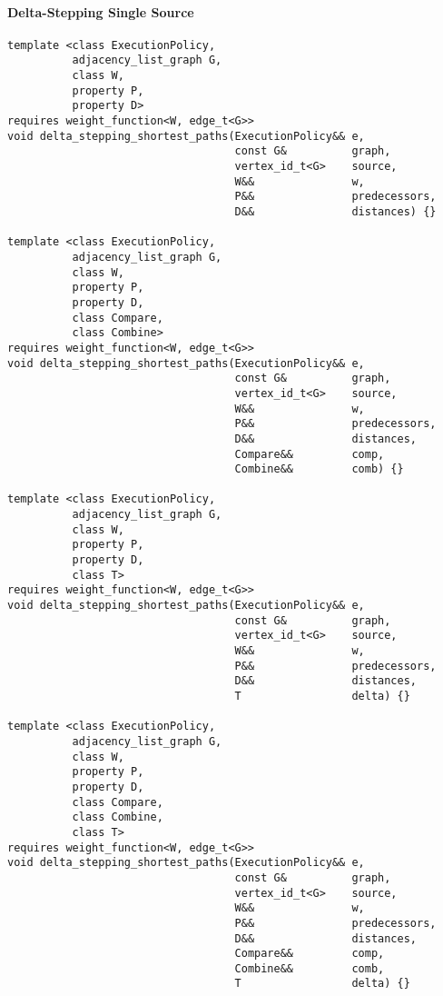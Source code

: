 \paragraph{Delta-Stepping Single Source}
\begin{lstlisting}
template <class ExecutionPolicy,
          adjacency_list_graph G,
          class W,
          property P,
          property D>
requires weight_function<W, edge_t<G>>
void delta_stepping_shortest_paths(ExecutionPolicy&& e,
                                   const G&          graph,
                                   vertex_id_t<G>    source,
                                   W&&               w,
                                   P&&               predecessors,
                                   D&&               distances) {}

template <class ExecutionPolicy,
          adjacency_list_graph G,
          class W,
          property P,
          property D,
          class Compare,
          class Combine>
requires weight_function<W, edge_t<G>>
void delta_stepping_shortest_paths(ExecutionPolicy&& e,
                                   const G&          graph,
                                   vertex_id_t<G>    source,
                                   W&&               w,
                                   P&&               predecessors,
                                   D&&               distances,
                                   Compare&&         comp,
                                   Combine&&         comb) {}

template <class ExecutionPolicy,
          adjacency_list_graph G,
          class W,
          property P,
          property D,
          class T>
requires weight_function<W, edge_t<G>>
void delta_stepping_shortest_paths(ExecutionPolicy&& e,
                                   const G&          graph,
                                   vertex_id_t<G>    source,
                                   W&&               w,
                                   P&&               predecessors,
                                   D&&               distances,
                                   T                 delta) {}

template <class ExecutionPolicy,
          adjacency_list_graph G,
          class W,
          property P,
          property D,
          class Compare,
          class Combine,
          class T>
requires weight_function<W, edge_t<G>>
void delta_stepping_shortest_paths(ExecutionPolicy&& e,
                                   const G&          graph,
                                   vertex_id_t<G>    source,
                                   W&&               w,
                                   P&&               predecessors,
                                   D&&               distances,
                                   Compare&&         comp,
                                   Combine&&         comb,
                                   T                 delta) {}



\end{lstlisting}
